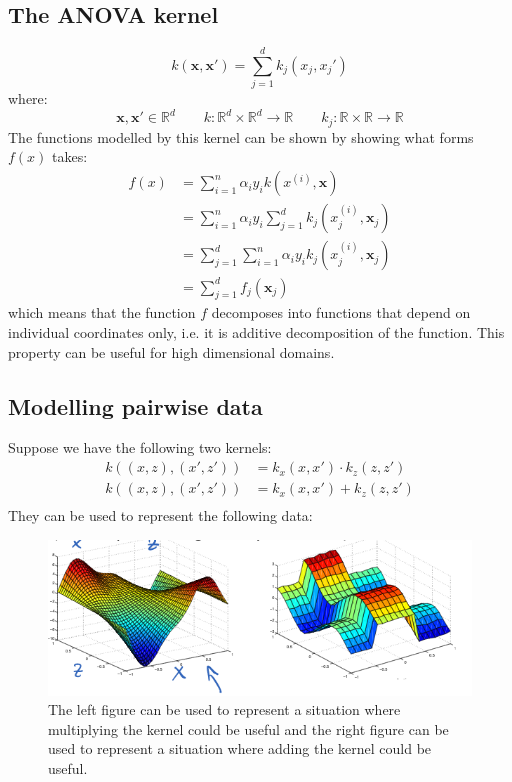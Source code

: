 \documentclass[a4paper,10pt,twoside]{article}
\begin{document}
\subsection{The ANOVA kernel}
\begin{equation*}
    k(\mathbf{x}, \mathbf{x}')=\sum_{j=1}^{d}k_j(x_j, x_j')
\end{equation*}
where:
\begin{equation*}
    \mathbf{x}, \mathbf{x}'\in\mathbb{R}^d\qquad k:\mathbb{R}^d\times\mathbb{R}^d\rightarrow \mathbb{R}\qquad k_j:\mathbb{R}\times\mathbb{R}\rightarrow\mathbb{R}
\end{equation*}
The functions modelled by this kernel can be shown by showing what forms $f(x)$ takes:
\begin{align*}
    f(x) &= \sum_{i=1}^{n}\alpha_i y_i k(x^(i),\mathbf{x})\\
    &= \sum_{i=1}^{n}\alpha_i y_i \sum_{j=1}^{d}k_j(x^(i)_j,\mathbf{x}_j)\\
    &= \sum_{j=1}^{d}\sum_{i=1}^{n}\alpha_i y_i k_j(x^(i)_j,\mathbf{x}_j)\\
    &= \sum_{j=1}^{d}f_j(\mathbf{x}_j)
\end{align*}
which means that the function $f$ decomposes into functions that depend on individual coordinates only, i.e. it is additive decomposition of the function. This property can be useful for high dimensional domains.

\subsection{Modelling pairwise data}

Suppose we have the following two kernels:
\begin{align}
    k((x,z),(x', z')) &= k_x(x,x')\cdot k_z(z,z')\\
    k((x,z),(x', z')) &= k_x(x,x') + k_z(z,z')\\
\end{align}
They can be used to represent the following data:
\begin{figure}[htbp]
    \centering
    \includegraphics[width=.8\textwidth]{figures/additive_and_multiplicative_effects_of_kernels.png}
    \caption{The left figure can be used to represent a situation where multiplying the kernel could be useful and the right figure can be used to represent a situation where adding the kernel could be useful.}
    \label{additive_and_multiplicative_effects_of_kernels}
\end{figure}
\end{document}
